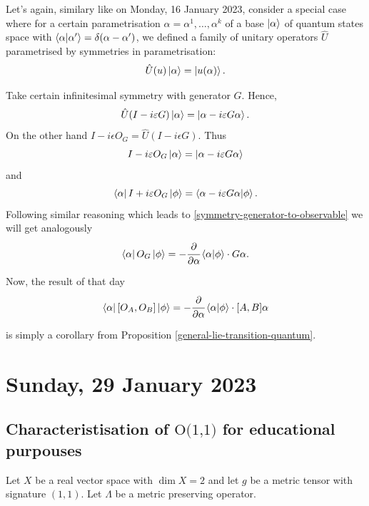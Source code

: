 \documentclass[main.tex]{subfiles}
\begin{document}
Let's again, similary like on Monday, 16 January 2023, consider a special case where for a certain parametrisation $\alpha = \alpha^1, \dots, \alpha^k$ of a base $\ket{\alpha}$ of quantum states space with $\bra{\alpha}\ket{\alpha'} = \delta(\alpha - \alpha')$, we defined a family of unitary operators $\hat{U}$ parametrised by symmetries in parametrisation:
\begin{equation}
\hat{U}(u)\ket{\alpha} = \ket{u(\alpha)}.
\end{equation}

Take certain infinitesimal symmetry with generator $G$. Hence,
\begin{equation}
\hat{U}(I - i\varepsilon G)\ket{\alpha} = \ket{\alpha - i\varepsilon G\alpha}.
\end{equation}
On the other hand $I - i\epsilon O_G = \hat{U}(I - i\epsilon G)$. Thus
\begin{equation}
I - i\varepsilon O_G\ket{\alpha} = \ket{\alpha - i\varepsilon G\alpha}
\end{equation}
and
\begin{equation}
\bra{\alpha} I + i\varepsilon O_G\ket{\phi} = \bra{\alpha - i\varepsilon G\alpha}\ket{\phi}.
\end{equation}
Following similar reasoning which leads to \ref{symmetry-generator-to-observable} we will get analogously
\begin{equation}
\bra{\alpha} O_G \ket{\phi} = - \cfrac{\partial}{\partial \alpha}  \bra{\alpha}\ket{\phi} \cdot G\alpha.
\end{equation}

Now, the result of that day 
\begin{equation}
\bra{\alpha} [O_A, O_B] \ket{\phi} = - \cfrac{\partial}{\partial \alpha} \bra{\alpha}\ket{\phi} \cdot [A, B]\alpha
\end{equation}

is simply a corollary from Proposition \ref{general-lie-transition-quantum}.

\section{Sunday, 29 January 2023}

\subsection{Characteristisation of $\text{O(1,1)}$ for educational purpouses}

Let $X$ be a real vector space with $\dim X = 2$ and let $g$ be a metric tensor with signature $(1,1)$. Let $\Lambda$ be a metric preserving operator.
\end{document}
